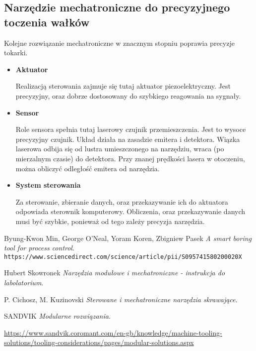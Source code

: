 \documentclass[13pt]{article}
\begin{document}

\newpage

\subsection{Narzędzie mechatroniczne do precyzyjnego toczenia wałków}
Kolejne rozwiązanie mechatroniczne w znacznym stopniu poprawia precyzje tokarki. 

\begin{itemize}
\item \textbf{Aktuator}

Realizacją sterowania zajmuje się tutaj aktuator piezoelektryczny. Jest precyzyjny, oraz dobrze dostosowany do szybkiego reagowania na sygnały.
\item \textbf{Sensor}

Role sensora spełnia tutaj laserowy czujnik przemieszczenia. Jest to wysoce precyzyjny czujnik. Układ działa na zasadzie emitera i detektora. Wiązka laserowa odbija się od lustra umieszczonego na narzędziu, wraca (po mierzalnym czasie) do detektora. Przy znanej prędkości lasera w otoczeniu, można obliczyć odległość emitera od narzędzia.
\item \textbf{System sterowania}

Za sterowanie, zbieranie danych, oraz przekazywanie ich do aktuatora odpowiada sterownik komputerowy. Obliczenia, oraz przekazywanie danych musi być szybkie, ponieważ od tego zależy precyzja narzędzia.
\end{itemize}



\newpage
\begin{thebibliography}{9}

Byung-Kwon Min, George O'Neal, Yoram Koren, Zbigniew Pasek
\textit{A smart boring tool for process control}. 
\\\texttt{https://www.sciencedirect.com/science/article/pii/S095741580200020X}


Hubert Skowronek
\textit{Narzędzia modułowe i mechatroniczne - instrukcja do labolatorium}.

P. Cichosz, M. Kuzinovski
\textit{Sterowane i mechatroniczne narzędzia skrawające}.

SANDVIK
\textit{Modularne rozwiązania}.

\url{https://www.sandvik.coromant.com/en-gb/knowledge/machine-tooling-solutions/tooling-considerations/pages/modular-solutions.aspx}
\end{thebibliography}
\end{document}
